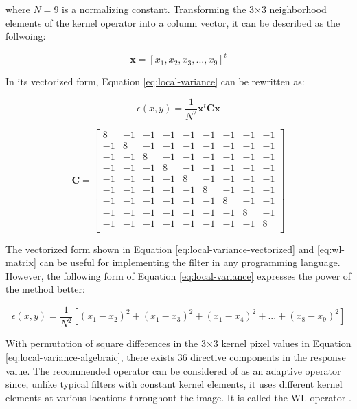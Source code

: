 where $N=9$ is a normalizing constant. Transforming the 3×3 neighborhood elements of the
kernel operator into a column vector, it can be described as the follwoing:

\begin{equation}
	\mathbf{x}=[x_{1},x_{2},x_{3},...,x_{9}]^{t}
	\label{eq:x-column-vector}
\end{equation}

In its vectorized form, Equation \ref{eq:local-variance} can be rewritten as:

\begin{equation}
	\epsilon(x,y)=\frac{1}{N^{2}}\mathbf{x}^{t}\mathbf{C}\mathbf{x}
	\label{eq:local-variance-vectorized}
\end{equation}

\begin{equation}
	\mathbf{C}=\begin{bmatrix}
		8 & -1 & -1 & -1 & -1 & -1 & -1 & -1 & -1\\
		-1 & 8 & -1 & -1 & -1 & -1 & -1 & -1 & -1\\
		-1 & -1 & 8 & -1 & -1 & -1 & -1 & -1 & -1\\
		-1 & -1 & -1 & 8 & -1 & -1 & -1 & -1 & -1\\
		-1 & -1 & -1 & -1 & 8 & -1 & -1 & -1 & -1\\
		-1 & -1 & -1 & -1 & -1 & 8 & -1 & -1 & -1\\
		-1 & -1 & -1 & -1 & -1 & -1 & 8 & -1 & -1\\
		-1 & -1 & -1 & -1 & -1 & -1 & -1 & 8 & -1\\
		-1 & -1 & -1 & -1 & -1 & -1 & -1 & -1 & 8\\
	\end{bmatrix}
	\label{eq:wl-matrix}
\end{equation}

The vectorized form shown in Equation \ref{eq:local-variance-vectorized} and \ref{eq:wl-matrix} can be useful for implementing the filter in any programming language. However, the following form of Equation \ref{eq:local-variance} expresses the power of the method better:

\begin{equation}
	\epsilon(x,y)=\frac{1}{N^{2}}[(x_{1}-x_{2})^{2}+(x_{1}-x_{3})^{2}+(x_{1}-x_{4})^{2}+...+(x_{8}-x_{9})^{2}]
	\label{eq:local-variance-algebraic}
\end{equation}

With permutation of square differences in the 3×3 kernel pixel values in Equation \ref{eq:local-variance-algebraic}, there exists 36 directive components in the response value. The recommended operator can be considered of as an adaptive operator since, unlike typical filters with constant kernel elements, it uses different kernel elements at various locations throughout the image. It is called the WL operator \cite{lin2018edge}.

